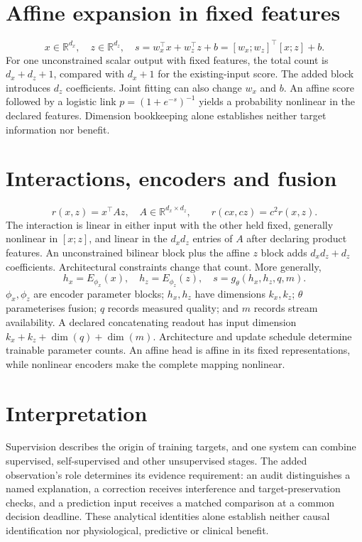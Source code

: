 \documentclass[11pt]{article}
\begin{document}
\section{Affine expansion in fixed features}
\[
x\in\mathbb R^{d_x},\quad z\in\mathbb R^{d_z},\quad
s=w_x^\top x+w_z^\top z+b
=[w_x;w_z]^\top[x;z]+b.
\]
For one unconstrained scalar output with fixed features, the total count is
$d_x+d_z+1$, compared with $d_x+1$ for the existing-input score. The added block
introduces $d_z$ coefficients. Joint fitting can also change $w_x$ and $b$.
An affine score followed by a logistic link
$p=(1+e^{-s})^{-1}$ yields a probability nonlinear in the declared features.
Dimension bookkeeping alone establishes neither target information nor benefit.

\section{Interactions, encoders and fusion}
\[
r(x,z)=x^\top A z,\quad A\in\mathbb R^{d_x\times d_z},\qquad
r(c x,c z)=c^2r(x,z).
\]
The interaction is linear in either input with the other held fixed, generally
nonlinear in $[x;z]$, and linear in the $d_xd_z$ entries of $A$ after declaring
product features. An unconstrained bilinear block plus the affine $z$ block
adds $d_xd_z+d_z$ coefficients. Architectural constraints change that count.
More generally,
\[
h_x=E_{\phi_x}(x),\quad h_z=E_{\phi_z}(z),\quad
s=g_\theta(h_x,h_z,q,m).
\]
$\phi_x,\phi_z$ are encoder parameter blocks; $h_x,h_z$ have dimensions
$k_x,k_z$; $\theta$ parameterises fusion; $q$ records measured quality; and $m$
records stream availability. A declared concatenating readout has input
dimension $k_x+k_z+\dim(q)+\dim(m)$. Architecture and update schedule determine
trainable parameter counts. An affine head is affine in its fixed
representations, while nonlinear encoders make the complete mapping nonlinear.

\section{Interpretation}
Supervision describes the origin of training targets, and one system can
combine supervised, self-supervised and other unsupervised stages. The added
observation's role determines its evidence requirement: an audit distinguishes
a named explanation, a correction receives interference and target-preservation
checks, and a prediction input receives a matched comparison at a common
decision deadline. These analytical identities alone establish neither causal
identification nor physiological, predictive or clinical benefit.
\end{document}
